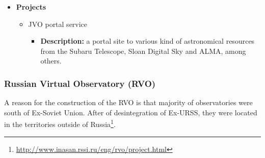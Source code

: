 \begin{itemize}
\item \textbf{Projects}
\begin{itemize}
\item JVO portal service
\begin{itemize}
\item \textbf{Description:} a portal site to various kind of astronomical
resources from the Subaru Telescope, Sloan Digital Sky and ALMA, among others.
\end{itemize}
\end{itemize}
\end{itemize}

\subsubsection{Russian Virtual Observatory (RVO)}
A reason for the construction of the RVO is that majority of observatories were
south of Ex-Soviet Union. After of desintegration of Ex-URSS, they were located
in the territories outside of
Russia\footnote{\url{http://www.inasan.rssi.ru/eng/rvo/project.html}}.

